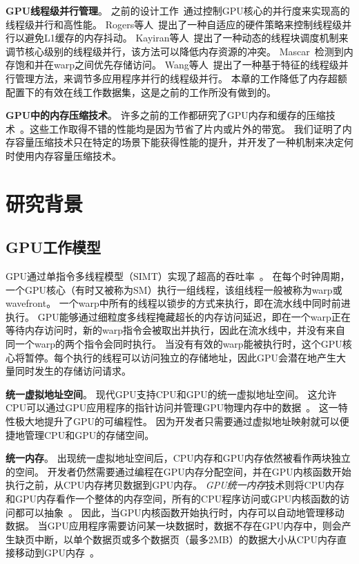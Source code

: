 \textbf{GPU线程级并行管理}。
之前的设计工作~通过控制GPU核心的并行度来实现高的线程级并行和高性能。
Rogers等人~提出了一种自适应的硬件策略来控制线程级并行以避免L1缓存的内存抖动。
Kayiran等人~提出了一种动态的线程块调度机制来调节核心级别的线程级并行，该方法可以降低内存资源的冲突。
Mascar~检测到内存饱和并在warp之间优先存储访问。
Wang等人~提出了一种基于特征的线程级并行管理方法，来调节多应用程序并行的线程级并行。
本章的工作降低了内存超额配置下的有效在线工作数据集，这是之前的工作所没有做到的。

\textbf{GPU中的内存压缩技术}。
许多之前的工作都研究了GPU内存和缓存的压缩技术~。这些工作取得不错的性能均是因为节省了片内或片外的带宽。
我们证明了内存容量压缩技术只在特定的场景下能获得性能的提升，并开发了一种机制来决定何时使用内存容量压缩技术。



\section{研究背景}
\label{background}

\subsection{GPU工作模型}
GPU通过单指令多线程模型（SIMT）实现了超高的吞吐率~。
在每个时钟周期，一个GPU核心（有时又被称为SM）执行一组线程，该组线程一般被称为warp或wavefront。
一个warp中所有的线程以锁步的方式来执行，即在流水线中同时前进执行。
GPU能够通过细粒度多线程掩藏超长的内存访问延迟，即在一个warp正在等待内存访问时，新的warp指令会被取出并执行，因此在流水线中，并没有来自同一个warp的两个指令会同时执行。
当没有有效的warp能被执行时，这个GPU核心将暂停。每个执行的线程可以访问独立的存储地址，因此GPU会潜在地产生大量同时发生的存储访问请求。

\textbf{统一虚拟地址空间}。
现代GPU支持CPU和GPU的统一虚拟地址空间。
这允许CPU可以通过GPU应用程序的指针访问并管理GPU物理内存中的数据~。
这一特性极大地提升了GPU的可编程性。
因为开发者只需要通过虚拟地址映射就可以便捷地管理CPU和GPU的存储空间。

\textbf{统一内存}。
出现统一虚拟地址空间后，CPU内存和GPU内存依然被看作两块独立的空间。
开发者仍然需要通过编程在GPU内存分配空间，并在GPU内核函数开始执行之前，从CPU内存拷贝数据到GPU内存。
\emph{GPU统一内存}技术则将CPU内存和GPU内存看作一个整体的内存空间，所有的CPU程序访问或GPU内核函数的访问都可以抽象~。
因此，当GPU内核函数开始执行时，内存可以自动地管理移动数据。
当GPU应用程序需要访问某一块数据时，数据不存在GPU内存中，则会产生缺页中断，以单个数据页或多个数据页（最多2MB）的数据大小从CPU内存直接移动到GPU内存~。

